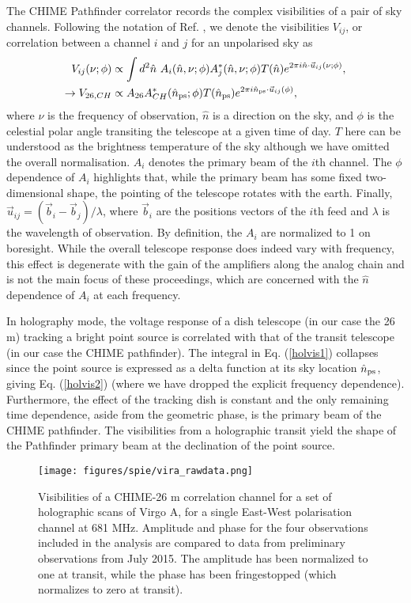 The CHIME Pathfinder correlator records the complex visibilities of a pair of sky channels. Following the notation of Ref. \citep{mmodes1}, we denote the visibilities $V_{ij}$, or correlation between a channel $i$ and $j$ for an unpolarised sky as
\begin{align}
V_{ij}(\nu ; \phi) & \propto \int d^2\hat{n}~A_i(\hat{n}, \nu;\phi)A^*_j(\hat{n}, \nu;\phi) T(\hat{n}) e^{2\pi i \hat{n}\cdot\vec{u}_{ij}(\nu;\phi)},
\label{holvis1}
\\
\rightarrow V_{26,CH} & \propto A_{26}A^*_{CH}(\hat{n}_{\rm ps};\phi) T(\hat{n}_{\rm ps}) e^{2\pi i \hat{n}_{\rm ps}\cdot\vec{u}_{ij}(\phi)},
\label{holvis2}
\end{align}
where $\nu$ is the frequency of observation, $\hat{n}$ is a direction on the sky, and $\phi$ is the celestial polar angle transiting the telescope at a given time of day. $T$ here can be understood as the brightness temperature of the sky although we have omitted the overall normalisation. $A_i$ denotes the primary beam of the $i$th channel. The $\phi$ dependence of $A_i$ highlights that, while the primary beam has some fixed two-dimensional shape, the pointing of the telescope rotates with the earth. Finally, $\vec{u}_{ij}=(\vec{b}_i - \vec{b}_j)/ \lambda$, where $\vec{b}_i$ are the positions vectors of the $i$th feed and $\lambda$ is the wavelength of observation. By definition, the $A_i$ are normalized to 1 on boresight. While the overall telescope response does indeed vary with frequency, this effect is degenerate with the gain of the amplifiers along the analog chain and is not the main focus of these proceedings, which are concerned with the $\hat{n}$ dependence of $A_i$ at each frequency. 

In holography mode, the voltage response of a dish telescope (in our case the 26 m) tracking a bright point source is correlated with that of the transit telescope (in our case the CHIME pathfinder). The integral in Eq. (\ref{holvis1}) collapses since the point source is expressed as a delta function at its sky location $\hat{n}_{\rm ps}$, giving Eq. (\ref{holvis2}) (where we have dropped the explicit frequency dependence). Furthermore, the effect of the tracking dish is constant and the only remaining time dependence, aside from the geometric phase, is the primary beam of the CHIME pathfinder. The visibilities from a holographic transit yield the shape of the Pathfinder primary beam at the declination of the point source.

\begin{figure}[h!]
\centering
\texttt{[image: figures/spie/vira\_rawdata.png]}
\caption{Visibilities of a CHIME-26 m correlation channel for a set of holographic scans of Virgo A, for a single East-West polarisation channel at 681 MHz. Amplitude and phase for the four observations included in the analysis are compared to data from preliminary observations from July 2015. The amplitude has been normalized to one at transit, while the phase has been fringestopped (which normalizes to zero at transit).}
\label{virraw}
\end{figure}

